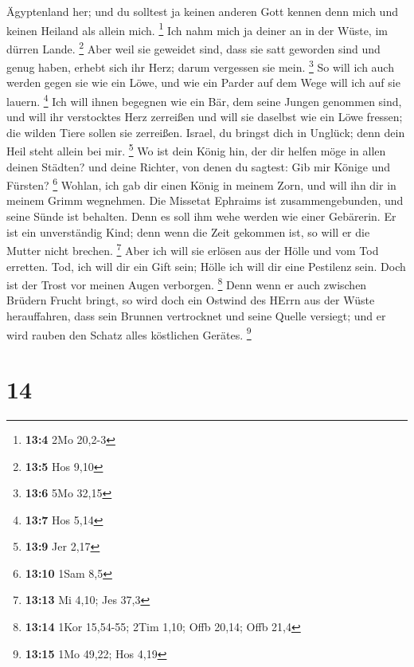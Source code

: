 Ägyptenland her; und du solltest ja keinen anderen Gott kennen denn mich
und keinen Heiland als allein mich. \footnote{\textbf{13:4} 2Mo 20,2-3}
 Ich nahm mich ja deiner an in der Wüste, im dürren Lande.
\footnote{\textbf{13:5} Hos 9,10}  Aber weil sie geweidet
sind, dass sie satt geworden sind und genug haben, erhebt sich ihr Herz;
darum vergessen sie mein. \footnote{\textbf{13:6} 5Mo 32,15}
 So will ich auch werden gegen sie wie ein Löwe, und wie ein
Parder auf dem Wege will ich auf sie lauern. \footnote{\textbf{13:7} Hos
  5,14}  Ich will ihnen begegnen wie ein Bär, dem seine
Jungen genommen sind, und will ihr verstocktes Herz zerreißen und will
sie daselbst wie ein Löwe fressen; die wilden Tiere sollen sie
zerreißen.  Israel, du bringst dich in Unglück; denn dein
Heil steht allein bei mir. \footnote{\textbf{13:9} Jer 2,17}
 Wo ist dein König hin, der dir helfen möge in allen deinen
Städten? und deine Richter, von denen du sagtest: Gib mir Könige und
Fürsten? \footnote{\textbf{13:10} 1Sam 8,5}  Wohlan, ich
gab dir einen König in meinem Zorn, und will ihn dir in meinem Grimm
wegnehmen.  Die Missetat Ephraims ist zusammengebunden, und
seine Sünde ist behalten.  Denn es soll ihm wehe werden wie
einer Gebärerin. Er ist ein unverständig Kind; denn wenn die Zeit
gekommen ist, so will er die Mutter nicht brechen. \footnote{\textbf{13:13}
  Mi 4,10; Jes 37,3}  Aber ich will sie erlösen aus der
Hölle und vom Tod erretten. Tod, ich will dir ein Gift sein; Hölle ich
will dir eine Pestilenz sein. Doch ist der Trost vor meinen Augen
verborgen. \footnote{\textbf{13:14} 1Kor 15,54-55; 2Tim 1,10; Offb
  20,14; Offb 21,4}  Denn wenn er auch zwischen Brüdern
Frucht bringt, so wird doch ein Ostwind des HErrn aus der Wüste
herauffahren, dass sein Brunnen vertrocknet und seine Quelle versiegt;
und er wird rauben den Schatz alles köstlichen Gerätes. \footnote{\textbf{13:15}
  1Mo 49,22; Hos 4,19}

\hypertarget{section-5}{%
\section{14}\label{section-5}}

